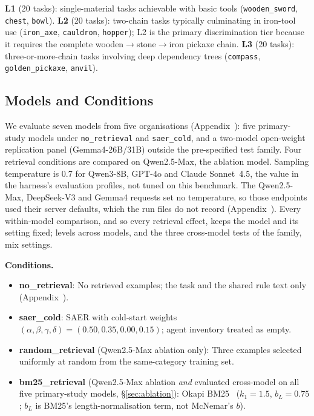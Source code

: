 \documentclass[letterpaper]{article} %
\newcommand{\secref}[1]{\S\ref{#1}}
\newcommand{\appref}[1]{Appendix~\getrefnumber{#1}}
\begin{document}
\textbf{L1} (20 tasks): single-material tasks achievable with basic
tools (\texttt{wooden\_sword}, \texttt{chest}, \texttt{bowl}).
\textbf{L2} (20 tasks): two-chain tasks typically culminating
in iron-tool use (\texttt{iron\_axe}, \texttt{cauldron},
\texttt{hopper}); L2 is the primary discrimination tier because it
requires the complete wooden$\to$stone$\to$iron pickaxe chain.
\textbf{L3} (20 tasks): three-or-more-chain tasks involving deep
dependency trees (\texttt{compass}, \texttt{golden\_pickaxe},
\texttt{anvil}).

\subsection{Models and Conditions}
\label{sec:models}

We evaluate seven models from five organisations (\appref{app:models}): five
primary-study models under \texttt{no\_retrieval} and \texttt{saer\_cold},
and a two-model open-weight replication panel (Gemma4-26B/31B) outside the
pre-specified test family.  Four retrieval conditions are compared on
Qwen2.5-Max, the ablation model.  Sampling temperature is 0.7 for Qwen3-8B,
GPT-4o and Claude Sonnet~4.5, the value in the harness's evaluation profiles,
not tuned on this benchmark.  The Qwen2.5-Max, DeepSeek-V3 and Gemma4 requests
set no temperature, so those endpoints used their server defaults, which the
run files do not record (\appref{app:models}).  Every within-model
comparison, and so every retrieval effect, keeps the model and its setting
fixed; levels across models, and the three cross-model tests of the family,
mix settings.

\noindent\textbf{Conditions.}
\begin{itemize}\setlength\itemsep{1pt}
  \item \textbf{no\_retrieval}: No retrieved examples; the task and the shared rule text only
  (\appref{app:prompt}).
  \item \textbf{saer\_cold}: SAER with cold-start weights
  $(\alpha,\beta,\gamma,\delta){=}(0.50,0.35,0.00,0.15)$; agent
  inventory treated as empty.
  \item \textbf{random\_retrieval} (Qwen2.5-Max ablation only): Three
  examples selected uniformly at random from the same-category training
  set.
  \item \textbf{bm25\_retrieval} (Qwen2.5-Max ablation \emph{and}
  evaluated cross-model on all five primary-study models, \secref{sec:ablation}): Okapi
  BM25~\citep{robertson2009probabilistic} ($k_1{=}1.5$, $b_L{=}0.75$;
  $b_L$ is BM25's length-normalisation term, not McNemar's $b$).
\end{itemize}
\end{document}
